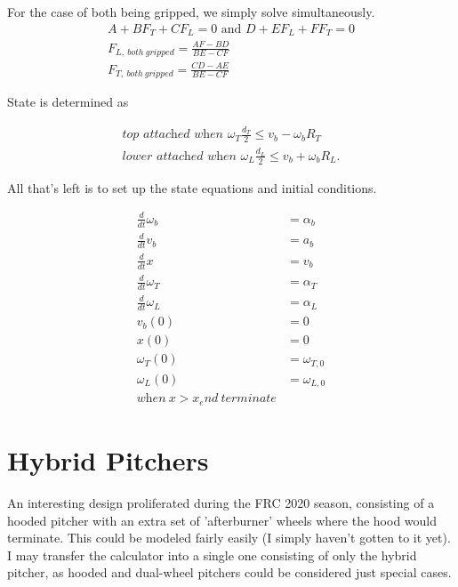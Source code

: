 \documentclass[10pt,letterpaper]{article}
\begin{document}
For the case of both being gripped, we simply solve simultaneously.
\begin{align}
	A + B F_T + C F_L = 0 \text{ and } D + E F_L + F F_T = 0 \nonumber \\
	F_{L,\ both\ gripped} = \frac{A F-B D}{B E-C F} \\
	F_{T,\ both\ gripped} = \frac{C D-A E}{B E-C F}
\end{align}

State is determined as

\begin{align}
	\textit{top attached when } \omega_{T} \frac{d_T}{2} \leq v_{b} - \omega_{b} R_T \\
	\textit{lower attached when } \omega_{L} \frac{d_L}{2} \leq v_{b} + \omega_{b} R_L .
\end{align}

	All that's left is to set up the state equations and initial conditions.

	\begin{align}
		\frac{d}{dt} \omega_b &= \alpha_b \\
		\frac{d}{dt} v_b &= a_b \\
		\frac{d}{dt} x &= v_b \\
		\frac{d}{dt} \omega_T &= \alpha_T \\
		\frac{d}{dt} \omega_L &= \alpha_L \\
		v_b(0) &= 0 \\
		x(0) &= 0 \\
		\omega_T(0) &= \omega_{T,0} \\
		\omega_L(0) &= \omega_{L,0} \\
		\textit{when} \ x > x_end \ \textit{terminate}
	\end{align}

\section*{Hybrid Pitchers}
An interesting design proliferated during the FRC 2020 season, consisting of a hooded pitcher with an extra set of 'afterburner' wheels where the hood would terminate. This could be modeled fairly easily (I simply haven't gotten to it yet). I may transfer the calculator into a single one consisting of only the hybrid pitcher, as hooded and dual-wheel pitchers could be considered just special cases.

\end{document}
